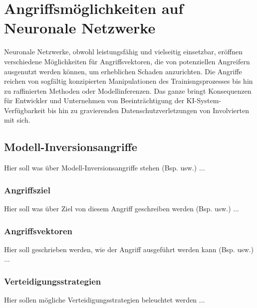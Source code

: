 \section{Angriffsmöglichkeiten auf Neuronale Netzwerke} \label{chpt:Stand_der_Technik_Angriffe}
Neuronale Netzwerke, obwohl leistungsfähig und vielseitig einsetzbar, eröffnen verschiedene Möglichkeiten für Angriffsvektoren, die von potenziellen Angreifern ausgenutzt werden können, um erheblichen Schaden anzurichten. Die Angriffe reichen von sogfältig konzipierten Manipulationen des Trainisngsprozesses bis hin zu raffinierten Methoden oder Modellinferenzen. Das ganze bringt  Konsequenzen für Entwickler und Unternehmen von Beeinträchtigung der KI-System-Verfügbarkeit bis hin zu gravierenden Datenschutzverletzungen von Involvierten mit sich.

\subsection{Modell-Inversionsangriffe}
Hier soll was über Modell-Inversionsangriffe stehen (Bsp. usw.) ...
\subsubsection{Angriffsziel}
Hier soll was über Ziel von diesem Angriff geschreiben werden (Bsp. usw.) ...
\subsubsection{Angriffsvektoren}
Hier soll geschrieben werden, wie der Angriff ausgeführt werden kann (Bsp. usw.) ...
\subsubsection{Verteidigungsstrategien}
Hier sollen mögliche Verteidigungsstrategien beleuchtet werden ...
